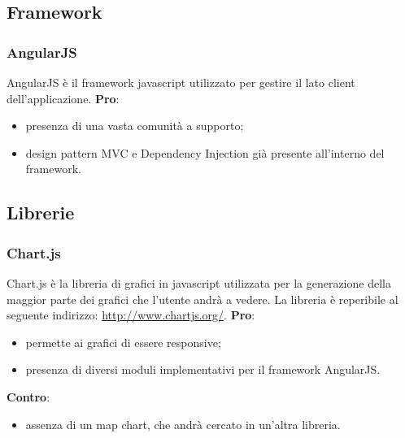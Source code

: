 
	\subsection{Framework} %
	\label{sub:framework}
		\subsubsection{AngularJS} %
		\label{ssub:angularjs}
		AngularJS è il framework javascript utilizzato per gestire il lato client dell'applicazione. \newline
		\textbf{Pro}:
			\begin{itemize}
				\item presenza di una vasta comunità a supporto;
				\item design pattern MVC e Dependency Injection già presente all'interno del framework.
			\end{itemize}
		\noindent



	\subsection{Librerie} %
	\label{sub:librerie}
		\subsubsection{Chart.js} %
		\label{ssub:chartsjs}
		Chart.js è la libreria di grafici in javascript utilizzata per la generazione della maggior parte dei grafici che l'utente andrà a vedere. La libreria è reperibile al seguente indirizzo: \url{http://www.chartjs.org/}. \newline
		\textbf{Pro}:
			\begin{itemize}
				\item permette ai grafici di essere responsive;
				\item presenza di diversi moduli implementativi per il framework AngularJS.
			\end{itemize}
		\noindent
		\newline
		\textbf{Contro}:
			\begin{itemize}
				\item assenza di un map chart, che andrà cercato in un'altra libreria.
			\end{itemize}
			\noindent
		

